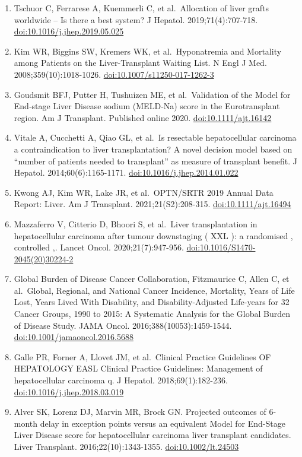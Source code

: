 \documentclass[11pt,english,]{book} %
\providecommand{\tightlist}{%
  \setlength{\itemsep}{0pt}\setlength{\parskip}{0pt}}
\begin{document}
\begin{enumerate}
\def\labelenumi{\arabic{enumi}.}
\tightlist
\item
  Tschuor C, Ferrarese A, Kuemmerli C, et al.~Allocation of liver grafts worldwide -- Is there a best system? J Hepatol. 2019;71(4):707-718. \url{doi:10.1016/j.jhep.2019.05.025}
\item
  Kim WR, Biggins SW, Kremers WK, et al.~Hyponatremia and Mortality among Patients on the Liver-Transplant Waiting List. N Engl J Med. 2008;359(10):1018-1026. \url{doi:10.1007/s11250-017-1262-3}
\item
  Goudsmit BFJ, Putter H, Tushuizen ME, et al.~Validation of the Model for End‐stage Liver Disease sodium (MELD‐Na) score in the Eurotransplant region. Am J Transplant. Published online 2020. \url{doi:10.1111/ajt.16142}
\item
  Vitale A, Cucchetti A, Qiao GL, et al.~Is resectable hepatocellular carcinoma a contraindication to liver transplantation? A novel decision model based on ``number of patients needed to transplant'' as measure of transplant benefit. J Hepatol. 2014;60(6):1165-1171. \url{doi:10.1016/j.jhep.2014.01.022}
\item
  Kwong AJ, Kim WR, Lake JR, et al.~OPTN/SRTR 2019 Annual Data Report: Liver. Am J Transplant. 2021;21(S2):208-315. \url{doi:10.1111/ajt.16494}
\item
  Mazzaferro V, Citterio D, Bhoori S, et al.~Liver transplantation in hepatocellular carcinoma after tumour downstaging ( XXL ): a randomised , controlled ,. Lancet Oncol. 2020;21(7):947-956. \url{doi:10.1016/S1470-2045(20)30224-2}
\item
  Global Burden of Disease Cancer Collaboration, Fitzmaurice C, Allen C, et al.~Global, Regional, and National Cancer Incidence, Mortality, Years of Life Lost, Years Lived With Disability, and Disability-Adjusted Life-years for 32 Cancer Groups, 1990 to 2015: A Systematic Analysis for the Global Burden of Disease Study. JAMA Oncol. 2016;388(10053):1459-1544. \url{doi:10.1001/jamaoncol.2016.5688}
\item
  Galle PR, Forner A, Llovet JM, et al.~Clinical Practice Guidelines OF HEPATOLOGY EASL Clinical Practice Guidelines: Management of hepatocellular carcinoma q. J Hepatol. 2018;69(1):182-236. \url{doi:10.1016/j.jhep.2018.03.019}
\item
  Alver SK, Lorenz DJ, Marvin MR, Brock GN. Projected outcomes of 6-month delay in exception points versus an equivalent Model for End-Stage Liver Disease score for hepatocellular carcinoma liver transplant candidates. Liver Transplant. 2016;22(10):1343-1355. \url{doi:10.1002/lt.24503}

\end{enumerate}
\end{document}
